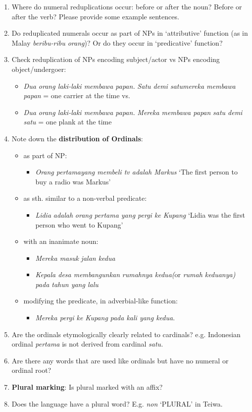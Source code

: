 \begin{enumerate}
\item Where do numeral reduplications occur: before or after the noun? Before or after the verb? Please provide some example sentences.
\item Do reduplicated numerals occur as part of NPs in `attributive' function (as in Malay \textit{beribu-ribu orang})? Or do they occur in `predicative' function?
\item  Check reduplication of NPs encoding subject/actor vs NPs encoding object/undergoer:
\begin{itemize}
\item \textit{Dua orang laki-laki membawa papan.} \textit{Satu demi satu}\textit{mereka membawa papan} = one carrier at the time vs.
\item \textit{Dua orang laki-laki membawa papan.} \textit{Mereka membawa papan} \textit{satu demi satu} = one plank at the time
\end{itemize}
\item  Note down the \textbf{distribution of Ordinals}:
\begin{itemize}
\item as part of NP:
\begin{itemize}
\item \textit{Orang pertama}\textit{yang membeli tv adalah Markus} `The first person to buy a radio was Markus'
\end{itemize}
\item as sth. similar to a non-verbal predicate:
\begin{itemize}
\item \textit{Lidia} \textit{adalah} \textit{orang pertama yang pergi ke Kupang} `Lidia was the first person who went to Kupang'
\end{itemize}
\item with an inanimate noun:
\begin{itemize}
\item \textit{Mereka masuk} \textit{jalan kedua}
\item \textit{Kepala desa membangunkan} \textit{rumahnya kedua}\textit{(}or \textit{rumah keduanya}\textit{) pada tahun yang lalu }
\end{itemize}
\item modifying the predicate, in adverbial-like function:
\begin{itemize}
\item \textit{Mereka pergi ke Kupang} \textit{pada kali yang kedua}.
\end{itemize}
\end{itemize}
\item  Are the ordinals etymologically clearly related to cardinals? e.g. Indonesian ordinal \textit{pertama} is not derived from cardinal \textit{satu.}
\item  Are there any words that are used like ordinals but have no numeral or ordinal root?
\item  \textbf{Plural marking}: Is plural marked with an affix?
\item  Does the language have a plural word? E.g. \textit{non} `PLURAL' in Teiwa.


\end{enumerate}
